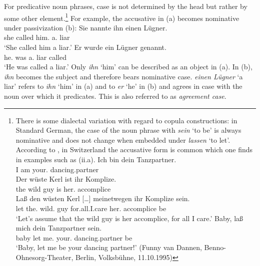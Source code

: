 {For predicative\label{page-Kasuskongruenz} noun phrases, case is not determined by the head but rather by some other element.\footnote{
	There is some dialectal variation with regard to copula constructions: in Standard German, the case of the noun phrase with \emph{sein} `to be'
	is always nominative and does not change when embedded under \emph{lassen} `to let'. According to \citet*[{\S}\,1259]{Duden95-Authors}, in Switzerland the
	accusative form is common which one finds in examples such as (ii.a).
	\eal
\ex 
\gll Ich bin dein Tanzpartner.\\
     I am your.\nom{} dancing.partner\\
\ex 
\gll Der wüste Kerl ist ihr Komplize.\\
     the wild  guy  is  her.\nom{} accomplice\\
\ex 
\gll Laß den wüsten Kerl [\ldots] meinetwegen ihr Komplize sein.\\
     let the.\acc{} wild.\acc{} guy {} for.all.I.care her.\nom{} accomplice be\\
\glt `Let's assume that the wild guy is her accomplice, for all I care.'  \citep*[{\S}\,6925]{Duden66-Authors}
\ex 
\gll Baby, laß mich dein Tanzpartner sein.\\
     baby let me.\acc{} your.\nom{} dancing.partner be\\
\glt `Baby, let me be your dancing partner!'  (Funny van Dannen, Benno-Ohnesorg-Theater, Berlin, Volksbühne, 11.10.1995)
\zl

        \eal
        \zllast
}
For example, the accusative in (a) becomes nominative under passivization (b):
\eal
\ex 
\gll Sie nannte ihn einen Lügner.\\
	 she called him.\acc{} a.\acc{} liar\\
\glt `She called him a liar.'
\ex 
\gll Er wurde ein Lügner genannt.\\
	 he.\nom{} was a.\nom{} liar called\\
\glt `He was called a liar.'
\zl
Only \emph{ihn} `him' can be described as an object in (a). In (b), \emph{ihn} becomes the subject and therefore 
bears nominative case. \emph{einen Lügner} `a liar' refers to \emph{ihn} `him' in (a) and to \emph{er}
`he' in (b) and agrees in case with the noun over which it predicates.
This is also referred to as \emph{agreement case}.

}
